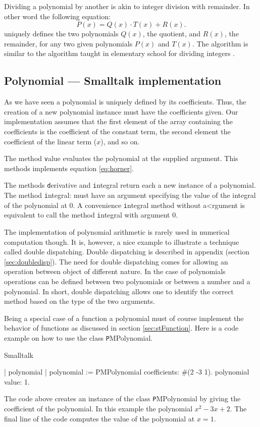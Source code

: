 Dividing a polynomial by another is akin to integer division with
remainder. In other word the following equation:
\begin{equation}
P\left(x\right)=Q\left(x\right)\cdot
T\left(x\right)+R\left(x\right).
\end{equation}
uniquely defines the two polynomials $Q\left(x\right)$, the
quotient, and $R\left(x\right)$, the remainder, for any two given
polynomials $P\left(x\right)$ and $T\left(x\right)$. The algorithm
is similar to the algorithm taught in elementary school for
dividing integers \cite{Knuth2}.

\subsection{Polynomial --- Smalltalk implementation}
As we have seen a polynomial is uniquely defined by its
coefficients. Thus, the creation of a new polynomial instance must
have the coefficients given. Our implementation assumes that the
first element of the array containing the coefficients is the
coefficient of the constant term, the second element the
coefficient of the linear term ($x$), and so on.

The method {\texttt value} evaluates the polynomial at the supplied
argument. This methods implements equation \ref{eq:horner}.

The methods {\texttt derivative} and {\texttt integral} return each a new
instance of a polynomial. The method {\texttt integral:} must have an
argument specifying the value of the integral of the polynomial at
0. A convenience {\texttt integral} method without a<rgument is
equivalent to call the method {\texttt integral} with argument 0.

The implementation of polynomial arithmetic is rarely used in
numerical computation though. It is, however, a nice example to
illustrate a technique called double dispatching. Double
dispatching is described in appendix (\cf section
\ref{sec:doubledisp}). The need for double dispatching comes for
allowing an operation between object of different nature. In the
case of polynomials operations can be defined between two
polynomials or between a number and a polynomial. In short, double
dispatching allows one to identify the correct method based on the
type of the two arguments.

Being a special case of a function a polynomial must of course implement the behavior of
functions as discussed in section \ref{sec:stFunction}.
Here is a code example on how to use the class {\texttt PMPolynomial}.
\begin{listing}{Smalltalk}

| polynomial |
 polynomial := PMPolynomial coefficients: #(2 -3 1).
 polynomial value: 1.
\end{listing}
The code above creates an instance of the class {\texttt
PMPolynomial} by giving the coefficient of the polynomial. In
this example the polynomial $x^2-3x+2$. The final line of the code
computes the value of the polynomial at $x=1$.

